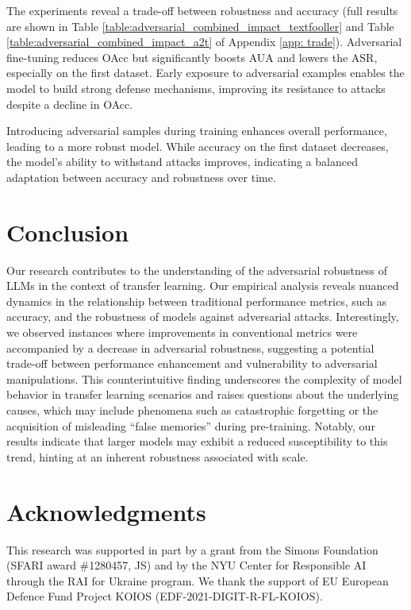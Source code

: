 \documentclass{article}
\begin{document}
The experiments reveal a trade-off between robustness and accuracy (full results are shown in Table \ref{table:adversarial_combined_impact_textfooller} and Table \ref{table:adversarial_combined_impact_a2t} of Appendix \ref{app: trade}). Adversarial fine-tuning reduces OAcc but significantly boosts AUA and lowers the ASR, especially on the first dataset. Early exposure to adversarial examples enables the model to build strong defense mechanisms, improving its resistance to attacks despite a decline in OAcc.

Introducing adversarial samples during training enhances overall performance, leading to a more robust model. While accuracy on the first dataset decreases, the model's ability to withstand attacks improves, indicating a balanced adaptation between accuracy and robustness over time.


\section{Conclusion}
Our research contributes to the understanding of the adversarial robustness of LLMs in the context of transfer learning. Our empirical analysis reveals nuanced dynamics in the relationship between traditional performance metrics, such as accuracy, and the robustness of models against adversarial attacks. Interestingly, we observed instances where improvements in conventional metrics were accompanied by a decrease in adversarial robustness, suggesting a potential trade-off between performance enhancement and vulnerability to adversarial manipulations. This counterintuitive finding underscores the complexity of model behavior in transfer learning scenarios and raises questions about the underlying causes, which may include phenomena such as catastrophic forgetting or the acquisition of misleading ``false memories'' during pre-training. Notably, our results indicate that larger models may exhibit a reduced susceptibility to this trend, hinting at an inherent robustness associated with scale.

\section*{Acknowledgments}
This research was supported in part by a grant from the Simons Foundation (SFARI award \#1280457, JS) and by the NYU Center for Responsible AI through the RAI for Ukraine program. We thank the support of EU European Defence Fund Project KOIOS (EDF-2021-DIGIT-R-FL-KOIOS).
\end{document}
